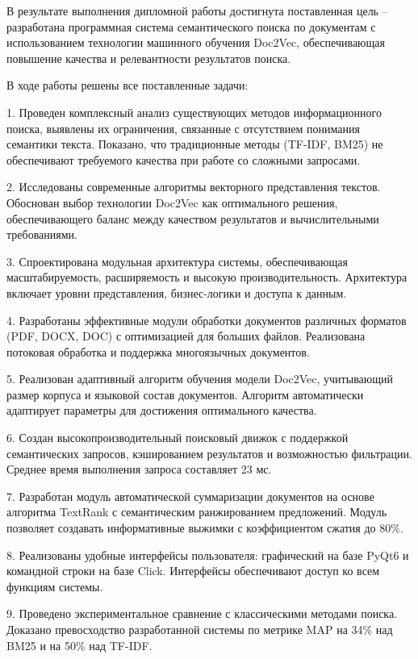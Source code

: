 
	В результате выполнения дипломной работы достигнута поставленная цель – разработана программная система семантического поиска по документам с использованием технологии машинного обучения Doc2Vec, обеспечивающая повышение качества и релевантности результатов поиска.
	
	В ходе работы решены все поставленные задачи:
	
	1. Проведен комплексный анализ существующих методов информационного поиска, выявлены их ограничения, связанные с отсутствием понимания семантики текста. Показано, что традиционные методы (TF-IDF, BM25) не обеспечивают требуемого качества при работе со сложными запросами.
	
	2. Исследованы современные алгоритмы векторного представления текстов. Обоснован выбор технологии Doc2Vec как оптимального решения, обеспечивающего баланс между качеством результатов и вычислительными требованиями.
	
	3. Спроектирована модульная архитектура системы, обеспечивающая масштабируемость, расширяемость и высокую производительность. Архитектура включает уровни представления, бизнес-логики и доступа к данным.
	
	4. Разработаны эффективные модули обработки документов различных форматов (PDF, DOCX, DOC) с оптимизацией для больших файлов. Реализована потоковая обработка и поддержка многоязычных документов.
	
	5. Реализован адаптивный алгоритм обучения модели Doc2Vec, учитывающий размер корпуса и языковой состав документов. Алгоритм автоматически адаптирует параметры для достижения оптимального качества.
	
	6. Создан высокопроизводительный поисковый движок с поддержкой семантических запросов, кэшированием результатов и возможностью фильтрации. Среднее время выполнения запроса составляет 23 мс.
	
	7. Разработан модуль автоматической суммаризации документов на основе алгоритма TextRank с семантическим ранжированием предложений. Модуль позволяет создавать информативные выжимки с коэффициентом сжатия до 80\%.
	
	8. Реализованы удобные интерфейсы пользователя: графический на базе PyQt6 и командной строки на базе Click. Интерфейсы обеспечивают доступ ко всем функциям системы.
	
	9. Проведено экспериментальное сравнение с классическими методами поиска. Доказано превосходство разработанной системы по метрике MAP на 34\% над BM25 и на 50\% над TF-IDF.
	
